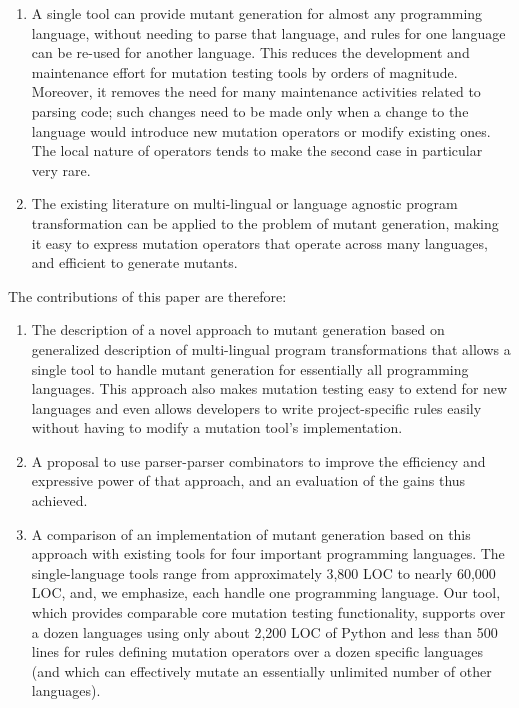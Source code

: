 \documentclass[sigconf,review, anonymous]{acmart}
\begin{document}
\begin{enumerate}
  \item A single tool can provide mutant generation for almost any
    programming language, without needing to parse that language, and
    rules for one language can be re-used for another language.  This
    reduces the development and maintenance effort for mutation
    testing tools by orders of magnitude.  Moreover, it removes the
    need for many   maintenance activities related to parsing code;
    such changes need to be made only when a change to the language
    would introduce new mutation operators or modify existing ones.
    The local nature of operators tends to make the second case in
    particular very rare.
    \item The existing literature on multi-lingual or language
      agnostic program transformation can be applied to the problem of
      mutant generation, making it easy to express mutation operators
      that operate across many languages, and efficient to generate
      mutants.
      \end{enumerate}

The contributions of this paper are therefore:

\begin{enumerate}
  \item The description of a novel approach to mutant generation
    based on generalized description of multi-lingual program transformations
    that allows a single tool to handle mutant generation for
    essentially all programming languages.  This approach also makes
    mutation testing easy to extend for new languages and even allows
    developers to write project-specific rules easily without
    having to modify a mutation tool's implementation.

          \item A proposal to use parser-parser combinators to improve the
      efficiency and expressive power of that approach, and an
      evaluation of the gains thus achieved.

    
      \item A comparison of an implementation of mutant generation
       based on this approach with existing tools for four important
       programming languages.  The single-language tools range from
       approximately 3,800 LOC to nearly 60,000 LOC, and, we emphasize, each handle
       one programming language.  Our tool, which provides comparable
       core mutation testing functionality, supports over a dozen
       languages using only about 2,200 LOC of Python and less than 500
       lines for rules defining mutation operators over a dozen
       specific languages (and which can effectively mutate an
       essentially unlimited number of other languages).

\end{enumerate}
\end{document}
